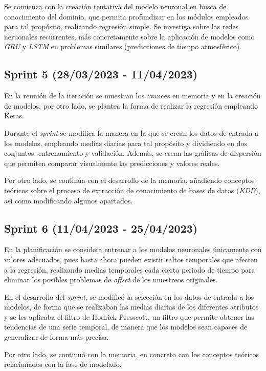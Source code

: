 Se comienza con la creación tentativa del modelo neuronal en busca de conocimiento del dominio, que permita profundizar en los módulos empleados para tal
propósito, realizando regresión simple.
Se investiga sobre las redes neruonales recurrentes, más concretamente sobre la aplicación de modelos como \textit{GRU} y \textit{LSTM} en problemas
similares (predicciones de tiempo atmosférico).

\subsection{Sprint 5 (28/03/2023 - 11/04/2023)}
En la reunión de la iteración se muestran los avances en memoria y en la creación de modelos, por otro lado, se plantea la forma de realizar la regresión
empleando Keras.

Durante el \textit{sprint} se modifica la manera en la que se crean los datos de entrada a los modelos, empleando medias diarias para tal propósito y 
dividiendo en dos conjuntos: entrenamiento y validación. Además, se crean las gráficas de dispersión que permiten comparar visualmente
las predicciones y valores reales.

Por otro lado, se continúa con el desarrollo de la memoria, añadiendo conceptos teóricos sobre el proceso de extracción de conocimiento de bases de datos 
(\textit{KDD}), así como modificando algunos apartados.

\subsection{Sprint 6 (11/04/2023 - 25/04/2023)}
En la planificación se considera entrenar a los modelos neuronales únicamente con valores adecuados, pues hasta ahora pueden existir saltos temporales que
afecten a la regresión, realizando medias temporales cada cierto periodo de tiempo para eliminar los posibles problemas de \textit{offset} de los 
muestreos originales.

En el desarrollo del \textit{sprint}, se modificó la selección en los datos de entrada a los modelos, de forma que se realizaban las medias diarias de los
diferentes atributos y se les aplicaba el filtro de Hodrick-Presscott, un filtro que permite obtener las tendencias de una serie temporal,
de manera que los modelos sean capaces de generalizar de forma más precisa.

Por otro lado, se continuó con la memoria, en concreto con los conceptos teóricos relacionados con la fase de modelado.

